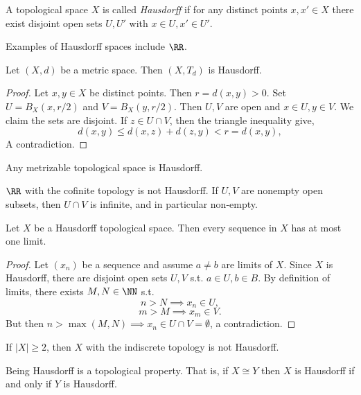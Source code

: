 \begin{definition}
  A topological space $X$ is called \emph{Hausdorff} if for any distinct points
  $x,x'\in X$ there exist disjoint open sets $U, U'$ with $x\in U, x'\in U'$.
  \label{def:HausdorffSpace}
\end{definition}
Examples of Hausdorff spaces include $\RR$.
\begin{lemma}
  Let $(X,d)$ be a metric space. Then $(X,T_d)$ is Hausdorff.
  \label{lem:metricTopologyHausdorff}
\end{lemma}
\begin{proof}
  Let $x,y\in X$ be distinct points. Then $r=d(x,y)>0$. Set $U=B_X(x, r/2)$ and
  $V=B_X(y, r/2)$. Then $U,V$ are open and $x\in U, y\in V$. We claim the sets
  are disjoint. If $z\in U\cap V$, then the triangle inequality give,
  \[d(x,y)\leq d(x,z)+d(z,y) < r = d(x,y),\]
  A contradiction.
\end{proof}
\begin{corollary}
  Any metrizable topological space is Hausdorff.
  \label{<+label+>}
\end{corollary}
\begin{example}
  $\RR$ with the cofinite topology is not Hausdorff. If $U,V$ are nonempty open
  subsets, then $U\cap V$ is infinite, and in particular non-empty.
\end{example}
\begin{proposition}
  Let $X$ be a Hausdorff topological space. Then every sequence in $X$ has at
  most one limit.
  \label{<+label+>}
\end{proposition}
\begin{proof}
  Let $(x_n)$ be a sequence and assume $a\neq b$ are limits of $X$. Since $X$ is
  Hausdorff, there are disjoint open sets $U,V$ s.t. $a\in U, b\in B$. By
  definition of limits, there exists $M,N\in\NN$ s.t.
  \[n>N \implies x_n\in U,\]
  \[m> M \implies x_m\in V.\]
  But then $n>\max (M,N)\implies x_n \in U\cap V=\emptyset$, a contradiction.
\end{proof}
\begin{corollary}
  If $|X|\geq 2$, then $X$ with the indiscrete topology is not Hausdorff. 
  \label{<+label+>}
\end{corollary}
\begin{proposition}
  Being Hausdorff is a topological property. That is, if $X\cong Y$ then $X$ is
  Hausdorff if and only if $Y$ is Hausdorff.
  \label{prop:hausdorffTopoProperty}
\end{proposition}
